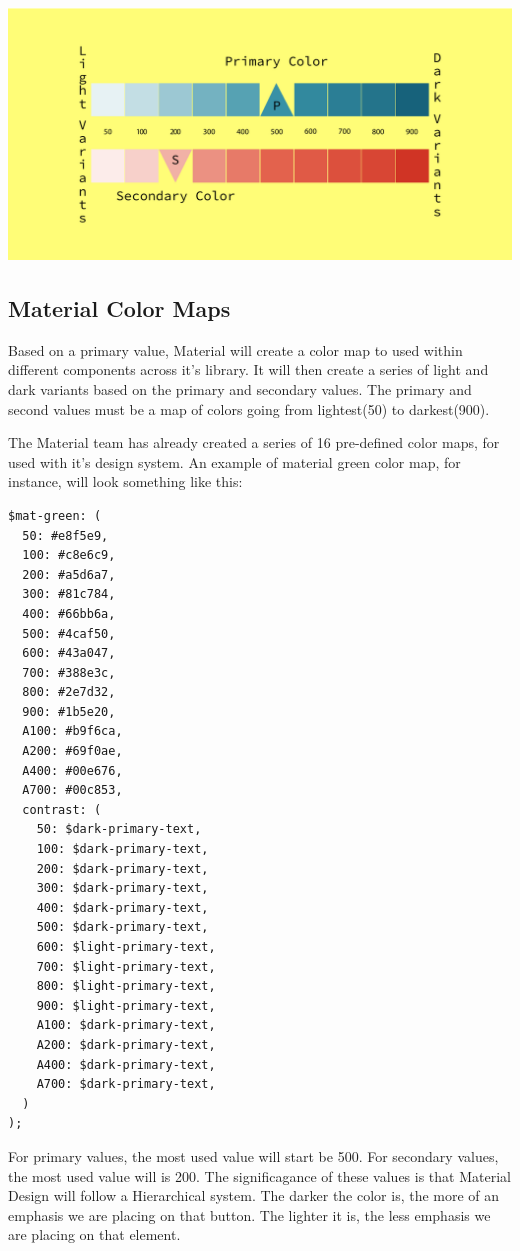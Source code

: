 \includegraphics[width=414pt]{design-language-system/material-overrides/material-design-palette_pt.pdf}

\subsection{Material Color Maps}

Based on a primary value, Material will create a color map to used within 
different components across it's library. It will then create a series of light
and dark variants based on the primary and secondary values. The primary and 
second values must be a map of colors going from lightest(50) to darkest(900).

The Material team has already created a series of 16 pre-defined color maps, 
for used with it's design system. An example of material green color map, for
instance, will look something like this: 
\begin{lstlisting}
$mat-green: (
  50: #e8f5e9,
  100: #c8e6c9,
  200: #a5d6a7,
  300: #81c784,
  400: #66bb6a,
  500: #4caf50,
  600: #43a047,
  700: #388e3c,
  800: #2e7d32,
  900: #1b5e20,
  A100: #b9f6ca,
  A200: #69f0ae,
  A400: #00e676,
  A700: #00c853,
  contrast: (
    50: $dark-primary-text,
    100: $dark-primary-text,
    200: $dark-primary-text,
    300: $dark-primary-text,
    400: $dark-primary-text,
    500: $dark-primary-text,
    600: $light-primary-text,
    700: $light-primary-text,
    800: $light-primary-text,
    900: $light-primary-text,
    A100: $dark-primary-text,
    A200: $dark-primary-text,
    A400: $dark-primary-text,
    A700: $dark-primary-text,
  )
);
\end{lstlisting}

For primary values, the most used value will start be 500. For secondary values, 
the most used value will is 200. The significagance of these values is that
Material Design will follow a Hierarchical system. The darker the color is, the 
more of an emphasis we are placing on that button. The lighter it is, the less 
emphasis we are placing on that element. 

